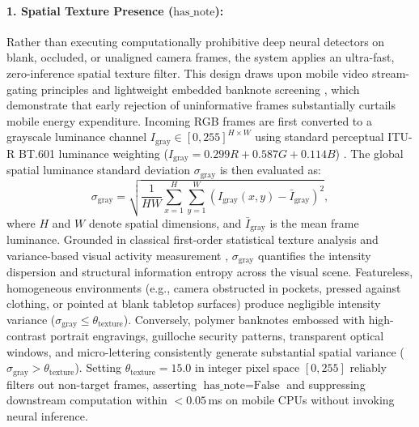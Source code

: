 \documentclass[final,5p,times,twocolumn,authoryear]{elsarticle}
\begin{document}
\paragraph{1. Spatial Texture Presence ($\text{has\_note}$):} Rather than executing computationally prohibitive deep neural detectors on blank, occluded, or unaligned camera frames, the system applies an ultra-fast, zero-inference spatial texture filter. This design draws upon mobile video stream-gating principles \cite{Chen2015,Zhang2017,Li2020} and lightweight embedded banknote screening \cite{Bruna2013}, which demonstrate that early rejection of uninformative frames substantially curtails mobile energy expenditure. Incoming RGB frames are first converted to a grayscale luminance channel $I_{\text{gray}} \in [0, 255]^{H \times W}$ using standard perceptual ITU-R BT.601 luminance weighting ($I_{\text{gray}} = 0.299R + 0.587G + 0.114B$) \cite{BT601,Poynton1993}. The global spatial luminance standard deviation $\sigma_{\text{gray}}$ is then evaluated as:
\begin{equation}
\sigma_{\text{gray}} = \sqrt{\frac{1}{HW} \sum_{x=1}^{H}\sum_{y=1}^{W} \left( I_{\text{gray}}(x,y) - \bar{I}_{\text{gray}} \right)^2},
\end{equation}
where $H$ and $W$ denote spatial dimensions, and $\bar{I}_{\text{gray}}$ is the mean frame luminance. Grounded in classical first-order statistical texture analysis \cite{Haralick1979,Gonzalez2008} and variance-based visual activity measurement \cite{PechPacheco2000}, $\sigma_{\text{gray}}$ quantifies the intensity dispersion and structural information entropy across the visual scene. Featureless, homogeneous environments (e.g., camera obstructed in pockets, pressed against clothing, or pointed at blank tabletop surfaces) produce negligible intensity variance ($\sigma_{\text{gray}} \le \theta_{\text{texture}}$). Conversely, polymer banknotes embossed with high-contrast portrait engravings, guilloche security patterns, transparent optical windows, and micro-lettering consistently generate substantial spatial variance ($\sigma_{\text{gray}} > \theta_{\text{texture}}$). Setting $\theta_{\text{texture}} = 15.0$ in integer pixel space $[0, 255]$ reliably filters out non-target frames, asserting $\text{has\_note} = \text{False}$ and suppressing downstream computation within $<0.05$\,ms on mobile CPUs without invoking neural inference.
\end{document}

